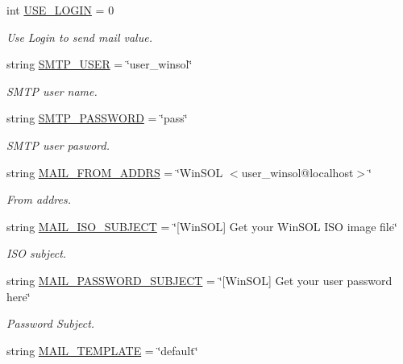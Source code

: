 \begin{CompactItemize}
int \hyperlink{namespaceweb__winsol_b8f70f09ea48dbef657f6d4df67709df}{USE\_\-LOGIN} = 0
\begin{CompactList}\small\item\em Use Login to send mail value. \item\end{CompactList}\item 
string \hyperlink{namespaceweb__winsol_d8d68eb9b49c5d54eec61ede319ce34e}{SMTP\_\-USER} = \char`\"{}user\_\-winsol\char`\"{}
\begin{CompactList}\small\item\em SMTP user name. \item\end{CompactList}\item 
string \hyperlink{namespaceweb__winsol_679bd8bf37d7fe61b45e3b7943bf3f90}{SMTP\_\-PASSWORD} = \char`\"{}pass\char`\"{}
\begin{CompactList}\small\item\em SMTP user pasword. \item\end{CompactList}\item 
string \hyperlink{namespaceweb__winsol_e64c609c73aa1864d87fbdaac4d96394}{MAIL\_\-FROM\_\-ADDRS} = \char`\"{}Win\-SOL $<$user\_\-winsol@localhost$>$\char`\"{}
\begin{CompactList}\small\item\em From addres. \item\end{CompactList}\item 
string \hyperlink{namespaceweb__winsol_a7122e806fc2a3a079c37b508f83f7dc}{MAIL\_\-ISO\_\-SUBJECT} = \char`\"{}\mbox{[}Win\-SOL\mbox{]} Get your Win\-SOL ISO image file\char`\"{}
\begin{CompactList}\small\item\em ISO subject. \item\end{CompactList}\item 
string \hyperlink{namespaceweb__winsol_e1b6763da828ac9eccd1dcba187f226e}{MAIL\_\-PASSWORD\_\-SUBJECT} = \char`\"{}\mbox{[}Win\-SOL\mbox{]} Get your user password here\char`\"{}
\begin{CompactList}\small\item\em Password Subject. \item\end{CompactList}\item 
string \hyperlink{namespaceweb__winsol_ab7bb89c8e14b61fccd8389c4ce6306e}{MAIL\_\-TEMPLATE} = \char`\"{}default\char`\"{}

\end{CompactItemize}
